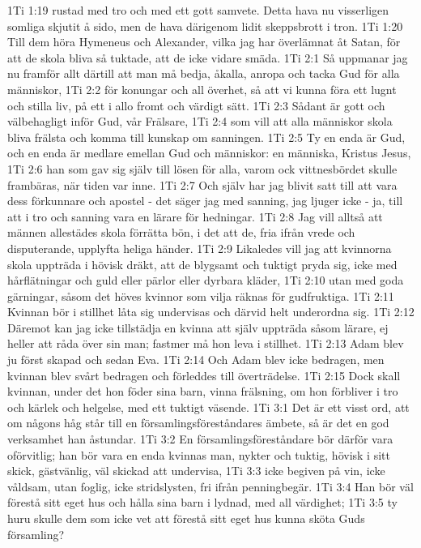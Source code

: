 1Ti 1:19  rustad med tro och med ett gott samvete. Detta hava nu visserligen somliga skjutit å sido, men de hava därigenom lidit skeppsbrott i tron.
1Ti 1:20  Till dem höra Hymeneus och Alexander, vilka jag har överlämnat åt Satan, för att de skola bliva så tuktade, att de icke vidare smäda.
1Ti 2:1  Så uppmanar jag nu framför allt därtill att man må bedja, åkalla, anropa och tacka Gud för alla människor,
1Ti 2:2  för konungar och all överhet, så att vi kunna föra ett lugnt och stilla liv, på ett i allo fromt och värdigt sätt.
1Ti 2:3  Sådant är gott och välbehagligt inför Gud, vår Frälsare,
1Ti 2:4  som vill att alla människor skola bliva frälsta och komma till kunskap om sanningen.
1Ti 2:5  Ty en enda är Gud, och en enda är medlare emellan Gud och människor: en människa, Kristus Jesus,
1Ti 2:6  han som gav sig själv till lösen för alla, varom ock vittnesbördet skulle frambäras, när tiden var inne.
1Ti 2:7  Och själv har jag blivit satt till att vara dess förkunnare och apostel - det säger jag med sanning, jag ljuger icke - ja, till att i tro och sanning vara en lärare för hedningar.
1Ti 2:8  Jag vill alltså att männen allestädes skola förrätta bön, i det att de, fria ifrån vrede och disputerande, upplyfta heliga händer.
1Ti 2:9  Likaledes vill jag att kvinnorna skola uppträda i hövisk dräkt, att de blygsamt och tuktigt pryda sig, icke med hårflätningar och guld eller pärlor eller dyrbara kläder,
1Ti 2:10  utan med goda gärningar, såsom det höves kvinnor som vilja räknas för gudfruktiga.
1Ti 2:11  Kvinnan bör i stillhet låta sig undervisas och därvid helt underordna sig.
1Ti 2:12  Däremot kan jag icke tillstädja en kvinna att själv uppträda såsom lärare, ej heller att råda över sin man; fastmer må hon leva i stillhet.
1Ti 2:13  Adam blev ju först skapad och sedan Eva.
1Ti 2:14  Och Adam blev icke bedragen, men kvinnan blev svårt bedragen och förleddes till överträdelse.
1Ti 2:15  Dock skall kvinnan, under det hon föder sina barn, vinna frälsning, om hon förbliver i tro och kärlek och helgelse, med ett tuktigt väsende.
1Ti 3:1  Det är ett visst ord, att om någons håg står till en församlingsföreståndares ämbete, så är det en god verksamhet han åstundar.
1Ti 3:2  En församlingsföreståndare bör därför vara oförvitlig; han bör vara en enda kvinnas man, nykter och tuktig, hövisk i sitt skick, gästvänlig, väl skickad att undervisa,
1Ti 3:3  icke begiven på vin, icke våldsam, utan foglig, icke stridslysten, fri ifrån penningbegär.
1Ti 3:4  Han bör väl förestå sitt eget hus och hålla sina barn i lydnad, med all värdighet;
1Ti 3:5  ty huru skulle dem som icke vet att förestå sitt eget hus kunna sköta Guds församling?
